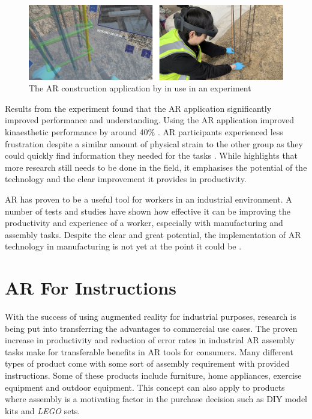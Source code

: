 \documentclass{l4proj}
\begin{document}
\begin{figure}[hbt!]
    \centering
    \includegraphics[width=0.8\linewidth]{dissertation//images/arConstruction.jpg}
    \caption{The AR construction application by \citet{wu_cognitive_2023} in use in an experiment}
    \label{fig:arConstruction}
\end{figure}

Results from the experiment found that the AR application significantly improved performance and understanding. Using the AR application improved kinaesthetic performance by around 40\% \citep{wu_cognitive_2023}. AR participants experienced less frustration despite a similar amount of physical strain to the other group as they could quickly find information they needed for the tasks \citep{wu_cognitive_2023}. While \citet{wu_cognitive_2023} highlights that more research still needs to be done in the field, it emphasises the potential of the technology and the clear improvement it provides in productivity.

AR has proven to be a useful tool for workers in an industrial environment. A number of tests and studies have shown how effective it can be improving the productivity and experience of a worker, especially with manufacturing and assembly tasks. Despite the clear and great potential, the implementation of AR technology in manufacturing is not yet at the point it could be \citep{jalo_state_2021}.

\section{AR For Instructions}

With the success of using augmented reality for industrial purposes, research is being put into transferring the advantages to commercial use cases. The proven increase in productivity and reduction of error rates in industrial AR assembly tasks make for transferable benefits in AR tools for consumers. Many different types of product come with some sort of assembly requirement with provided instructions. Some of these products include furniture, home appliances, exercise equipment and outdoor equipment. This concept can also apply to products where assembly is a motivating factor in the purchase decision such as DIY model kits and \textit{LEGO} sets.
\end{document}
